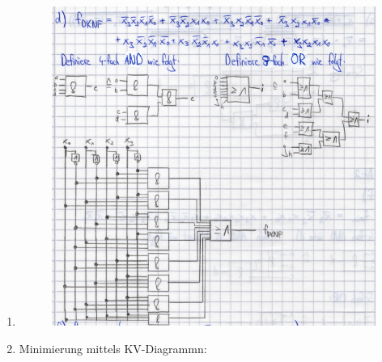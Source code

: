 \documentclass[a4paper]{article}
\begin{document}
\begin{enumerate}[label=\alph*)]
	\item 
	\begin{figure}[h!]
		\begin{center}
			\includegraphics[scale=0.35]{Aufgabe2d.png}
		\end{center}
	\end{figure} 
	
	\item Minimierung mittels KV-Diagrammn:
	

\end{enumerate}
\end{document}
